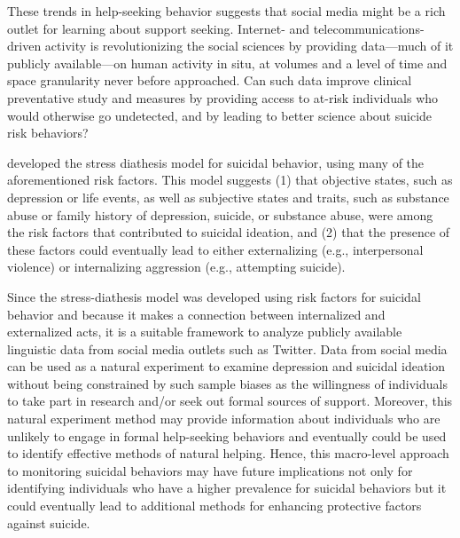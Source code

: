 \documentclass[11pt]{article}
\begin{document}
These trends in help-seeking behavior suggests that social media might be a rich outlet for learning about support seeking.
Internet- and telecommunications-driven activity is revolutionizing the social sciences by providing data---much of it publicly available---on human activity in situ, at volumes and a level of time and space granularity never before approached. Can such data improve clinical preventative study and measures by providing access to at-risk individuals who would otherwise go undetected, and by leading to better science about suicide risk behaviors? 

 developed the stress diathesis model for suicidal behavior, using many of the aforementioned risk factors.  This model suggests (1) that objective states, such as depression or life events, as well as subjective states and traits, such as substance abuse or family history of depression, suicide, or substance abuse, were among the risk factors that contributed to suicidal ideation, and (2) that the presence of these factors could eventually lead to either externalizing (e.g., interpersonal violence) or internalizing aggression (e.g., attempting suicide).

	Since the stress-diathesis model was developed using risk factors for suicidal behavior and because it makes a connection between internalized and externalized acts, it is a suitable framework to analyze publicly available linguistic data from social media outlets such as Twitter. Data from social media can be used as a natural experiment to examine depression and suicidal ideation without being constrained by such sample biases as the willingness of individuals to take part in research and/or seek out formal sources of support. Moreover, this natural experiment method may provide information about individuals who are unlikely to engage in formal help-seeking behaviors and eventually could be used to identify effective methods of natural helping. Hence, this macro-level approach to monitoring suicidal behaviors may have future implications not only for identifying individuals who have a higher prevalence for suicidal behaviors but it could eventually lead to additional methods for enhancing protective factors against suicide.  
\end{document}
